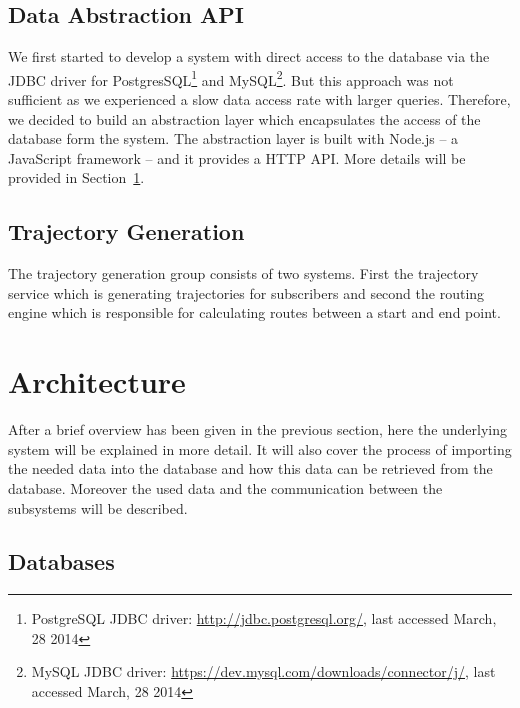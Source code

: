\documentclass[master,english]{hgbthesis}
\begin{document}
\subsection{Data Abstraction API}
We first started to develop a system with direct access to the database via the JDBC driver for PostgresSQL\footnote{PostgreSQL JDBC driver: \url{http://jdbc.postgresql.org/}, last accessed March, 28 2014} and MySQL\footnote{MySQL JDBC driver: \url{https://dev.mysql.com/downloads/connector/j/}, last accessed March, 28 2014}. But this approach was not sufficient as we experienced a slow data access rate with larger queries. Therefore, we decided to build an abstraction layer which encapsulates the access of the database form the system. The abstraction layer is built with Node.js -- a JavaScript framework -- and it provides a HTTP API. More details will be provided in Section~\ref{sec:architecture}.
\subsection{Trajectory Generation}
The trajectory generation group consists of two systems. First the trajectory service which is generating trajectories for subscribers and second the routing engine which is responsible for calculating routes between a start and end point.
\section{Architecture}
\label{sec:architecture}
After a brief overview has been given in the previous section, here the underlying system will be explained in more detail. It will also cover the process of importing the needed data into the database and how this data can be retrieved from the database. Moreover the used data and the communication between the subsystems will be described.
\subsection{Databases}
\end{document}
